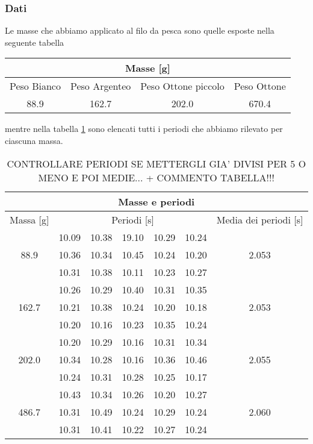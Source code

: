 \subsubsection{Dati}
Le masse che abbiamo applicato al filo da pesca sono quelle esposte nella seguente tabella

\begin{center}
	\begin{tabular}{c c c c}
			\multicolumn{4}{c}{\textbf{Masse [g]}} \\
	        \toprule
	        Peso Bianco & Peso Argenteo & Peso Ottone piccolo & Peso Ottone \\
	        \midrule
	        88.9 & 162.7 & 202.0 & 670.4 \\ 
	        \bottomrule
	\end{tabular}
\end{center}
mentre nella tabella \ref{tab:masse_periodi} sono elencati tutti i periodi che abbiamo rilevato per ciascuna massa.\\
\begin{table}
    \centering
    \begin{tabular}{c c c c c c c}
        \multicolumn{7}{c}{\textbf{Masse e periodi}} \\
        \toprule
        Massa [\si{\gram}] & \multicolumn{5}{c}{Periodi [s]} & Media dei periodi [s]\\
        \midrule
	\multirow{3}{*}{88.9}	& 10.09	& 10.38	& 19.10	& 10.29	& 10.24 & \multirow{3}{*}{2.053}\\
				& 10.36	& 10.34	& 10.45	& 10.24	& 10.20 &\\
				& 10.31	& 10.38	& 10.11	& 10.23	& 10.27 &\\
				\midrule
	\multirow{3}{*}{162.7}	& 10.26	& 10.29	& 10.40	& 10.31	& 10.35 & \multirow{3}{*}{2.053}\\
				& 10.21	& 10.38	& 10.24	& 10.20	& 10.18	\\
				& 10.20	& 10.16	& 10.23	& 10.35	& 10.24 \\
				\midrule
	\multirow{3}{*}{202.0}	& 10.20	& 10.29	& 10.16	& 10.31	& 10.34 & \multirow{3}{*}{2.055}\\
				& 10.34	& 10.28	& 10.16	& 10.36	& 10.46 \\
				& 10.24	& 10.31	& 10.28	& 10.25	& 10.17 \\
				\midrule
	\multirow{3}{*}{486.7}	& 10.43	& 10.34	& 10.26	& 10.20	& 10.27 & \multirow{3}{*}{2.060}\\
				& 10.31	& 10.49	& 10.24	& 10.29	& 10.24 \\
				& 10.31	& 10.41	& 10.22	& 10.27	& 10.24 \\
        \bottomrule
    \end{tabular}
    \caption{CONTROLLARE PERIODI SE METTERGLI GIA' DIVISI PER 5 O MENO E POI MEDIE... + COMMENTO TABELLA!!!}
    \label{tab:masse_periodi}
\end{table}

